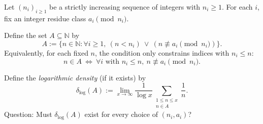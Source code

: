 Let $(n_i)_{i\ge 1}$ be a strictly increasing sequence of integers with $n_i\ge 1$.
For each $i$, fix an integer residue class $a_i\pmod{n_i}$.

Define the set $A\subseteq\mathbb N$ by
\[
A := \{n\in\mathbb N : \forall i\ge 1,\ (n<n_i)\ \lor\ (n\not\equiv a_i \pmod{n_i})\}.
\]
Equivalently, for each fixed $n$, the condition only constrains indices with $n_i\le n$:
\[
 n\in A\ \Longleftrightarrow\ \forall i\text{ with }n_i\le n,\ n\not\equiv a_i\pmod{n_i}.
\]

Define the \emph{logarithmic density} (if it exists) by
\[
\delta_{\log}(A) := \lim_{x\to\infty} \frac{1}{\log x}\sum_{\substack{1\le n\le x\\ n\in A}}\frac{1}{n}.
\]
Question: Must $\delta_{\log}(A)$ exist for every choice of $(n_i,a_i)$?
